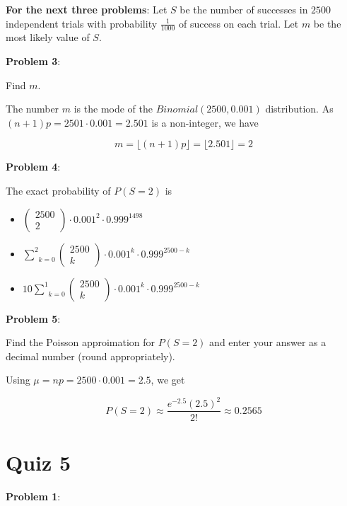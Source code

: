\documentclass{article}
\begin{document}
\noindent\textbf{For the next three problems}: Let $S$ be the number of successes in $2500$ independent trials with probability $\frac{1}{1000}$ of success on each trial. Let $m$ be the most likely value of $S$.

\noindent\textbf{Problem 3}: 

Find $m$.

{\color{blue}

The number $m$ is the mode of the $Binomial(2500, 0.001)$ distribution. As $(n+1)p=2501\cdot0.001=2.501$ is a non-integer, we have

$$m=\lfloor(n+1)p\rfloor=\lfloor2.501\rfloor=2$$

}

\noindent\textbf{Problem 4}:

The exact probability of $P(S=2)$ is 

\begin{itemize}
    \item {\color{blue}$\begin{pmatrix}2500\\2\end{pmatrix}\cdot0.001^2\cdot0.999^{1498}$}
    \item $\underset{k=0}{\overset{2}{\sum}}\begin{pmatrix}2500\\k\end{pmatrix}\cdot0.001^k\cdot0.999^{2500-k}$
    \item $10\underset{k=0}{\overset{1}{\sum}}\begin{pmatrix}2500\\k\end{pmatrix}\cdot0.001^k\cdot0.999^{2500-k}$
\end{itemize}

\noindent\textbf{Problem 5}:

Find the Poisson approimation for $P(S=2)$ and enter your answer as a decimal number (round appropriately).

{\color{blue}

Using $\mu=np=2500\cdot0.001=2.5$, we get

$$P(S=2)\approx\frac{e^{-2.5}(2.5)^2}{2!}\approx0.2565$$

}

\section{Quiz 5}

\noindent\textbf{Problem 1}:
\end{document}
